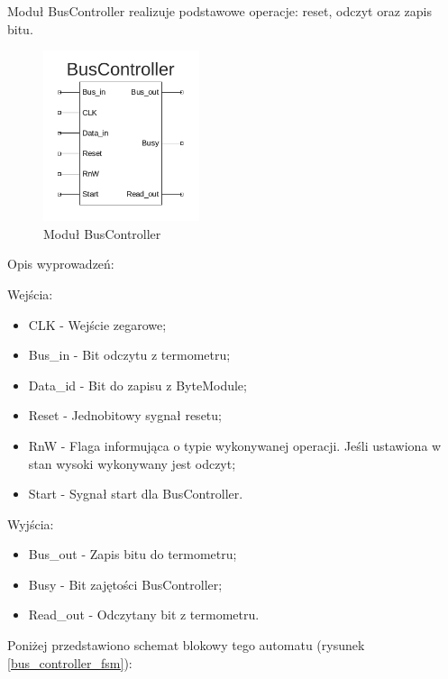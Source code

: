 \documentclass[a4paper]{article}
\begin{document}
Moduł BusController realizuje podstawowe operacje: reset, odczyt oraz zapis bitu.  

\begin{figure}[H]
\begin{center}
\includegraphics[height=5cm]{graphics/bus_controller_sym.png}
\end{center}
\caption{Moduł BusController}
\label{bus_controller_sym}
\end{figure}

Opis wyprowadzeń:

Wejścia:
\begin{itemize}
\item CLK - Wejście zegarowe;
\item Bus\_in - Bit odczytu z termometru;
\item Data\_id - Bit do zapisu z ByteModule;
\item Reset - Jednobitowy sygnał resetu;
\item RnW - Flaga informująca o typie wykonywanej operacji. Jeśli ustawiona w stan wysoki wykonywany jest odczyt;
\item Start - Sygnał start dla BusController.
\end{itemize}

Wyjścia: 
\begin{itemize}
\item Bus\_out - Zapis bitu do termometru; 
\item Busy - Bit zajętości BusController;
\item Read\_out -  Odczytany bit z termometru.
\end{itemize}

Poniżej przedstawiono schemat blokowy tego automatu (rysunek \ref{bus_controller_fsm}):
\end{document}
